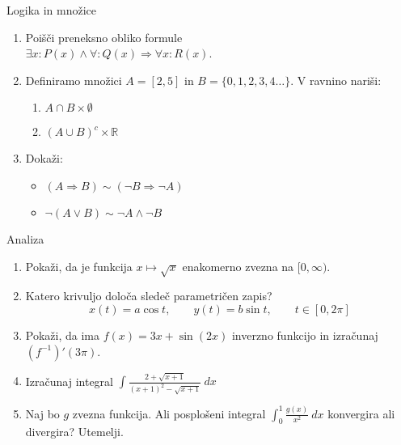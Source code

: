 \begin{frame}{Logika in množice}
	\begin{enumerate}
		\item
		Poišči preneksno obliko formule \\$\exists x: P(x)\land\forall: Q(x)\Rightarrow \forall x: R(x)$.
		\item 
		Definiramo množici $A=[2,5]$ in $B=\{0,1,2,3,4\dots\}$.
		V ravnino nariši:
		\begin{enumerate}
		   \item $A\cap B\times\emptyset$
		   \item $(A\cup B)^c\times \mathbb{R}$
		\end{enumerate}
		\item
		Dokaži:
		\begin{itemize}
			\item $(A\Rightarrow B)\sim(\neg B\Rightarrow\neg A)$
			\item $\neg(A\lor B)\sim \neg A\land\neg B$
		\end{itemize}
	\end{enumerate}
\end{frame}

\begin{frame}{Analiza}
	\begin{enumerate}
		\item
		Pokaži, da je funkcija $x\mapsto\sqrt{x}$ enakomerno zvezna na $[0,\infty)$.
		\item 
		Katero krivuljo določa sledeč parametričen zapis?
		$$
		   x(t) = a \cos t, \qquad %
		   y(t) = b \sin t, \qquad%
		   t \in [0, 2 \pi]
		$$ 
		\item
		Pokaži, da ima $f(x)=3x+\sin(2x)$ inverzno funkcijo in izračunaj $(f^{-1})'(3\pi)$.
		
		\item
		Izračunaj integral 
		${\displaystyle\int\displaystyle\frac{2+\sqrt{x+1}}{(x+1)^2-\sqrt{x+1}}\ dx}$
		\item 
		Naj bo $g$ zvezna funkcija. Ali posplošeni integral 
		$\int_0^1 \frac{g(x)}{x^2}\ dx$
		konvergira ali divergira? Utemelji.
	\end{enumerate}
\end{frame}

